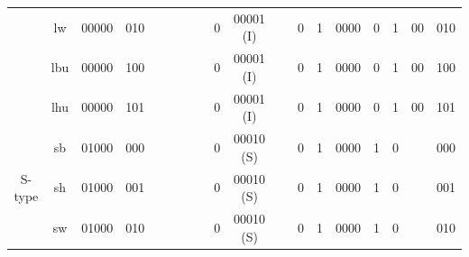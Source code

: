 \documentclass[12pt,a4paper,oneside]{book} %
\begin{document}
\begin{landscape}
\begin{table}[H]
{\begin{tabular}{|c|c|c|c|c|c|c|c|c|c|c|c|c|c|c|c|c|}
                         & lw     & 00000     & 010         & ~        & ~    & ~    & 0     & 00001 (I) & ~    & 0    & 1    & 0000   & 0     & 1      & 00    & 010     \\ \cline{2-17} 
                         & lbu    & 00000     & 100         & ~        & ~    & ~    & 0     & 00001 (I) & ~    & 0    & 1    & 0000   & 0     & 1      & 00    & 100     \\ \cline{2-17} 
                         & lhu    & 00000     & 101         & ~        & ~    & ~    & 0     & 00001 (I) & ~    & 0    & 1    & 0000   & 0     & 1      & 00    & 101     \\ \hline
\multirow{3}{*}{S-type}  & sb     & 01000     & 000         & ~        & ~    & ~    & 0     & 00010 (S) & ~    & 0    & 1    & 0000   & 1     & 0      & ~     & 000     \\ \cline{2-17} 
                         & sh     & 01000     & 001         & ~        & ~    & ~    & 0     & 00010 (S) & ~    & 0    & 1    & 0000   & 1     & 0      & ~     & 001     \\ \cline{2-17} 
                         & sw     & 01000     & 010         & ~        & ~    & ~    & 0     & 00010 (S) & ~    & 0    & 1    & 0000   & 1     & 0      & ~     & 010     \\ \hline
\end{tabular}
}
\end{table}
\end{landscape}
\end{document}
